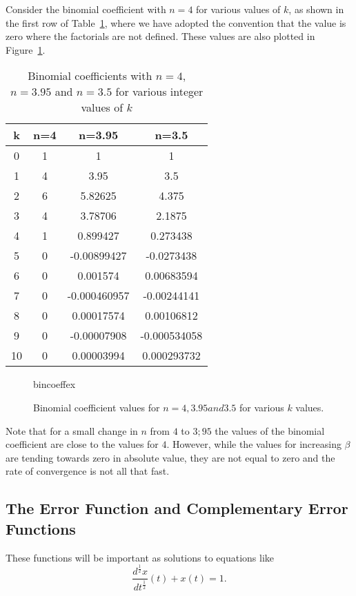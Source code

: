 \begin{example}
  Consider the binomial coefficient with $n=4$ for various values of $k$, as shown in the first row of Table~\ref{tab:binomialex}, where we have adopted the convention that the value is zero where the factorials are not defined. These values are also plotted in Figure~\ref{fig:binomialex}. 

  \begin{table}
    \centering
    \begin{tabular}{|c||c|c|c|}
      \hline k & n=4&n=3.95&n=3.5 \\
\hline \hline
0& 1& 1& 1\\ \hline
1& 4& 3.95 &3.5\\ \hline
2& 6& 5.82625& 4.375\\ \hline
3& 4& 3.78706& 2.1875\\ \hline
4& 1& 0.899427& 0.273438\\ \hline 
5& 0& -0.00899427& -0.0273438\\ \hline
6& 0& 0.001574& 0.00683594\\ \hline
7& 0& -0.000460957& -0.00244141\\ \hline
8& 0&  0.00017574& 0.00106812\\ \hline
9& 0& -0.00007908& -0.000534058\\ \hline
10& 0& 0.00003994& 0.000293732 \\ \hline
    \end{tabular}
    \caption{Binomial coefficients with $n=4$, $n=3.95$ and $n=3.5$ for various integer values of $k$}
    \label{tab:binomialex}
  \end{table}

  \begin{figure}
    \centering
    {bincoeffex}
    \caption{Binomial coefficient values for $n=4, 3.95 and 3.5$ for various $k$ values.}
    \label{fig:binomialex}
  \end{figure}

  Note that for a small change in $n$ from $4$ to $3;95$ the values of the binomial coefficient are close to the values for $4$. However, while the values for increasing $\beta$ are tending towards zero in absolute value, they are not equal to zero and the rate of convergence is not all that fast.
\end{example}

\subsection{The Error Function and Complementary Error Functions}
These functions will be important as solutions to equations like
\begin{equation*}
  \frac{d^\frac{1}{2} x}{d t^\frac{1}{2}}(t) + x(t) = 1.
\end{equation*}

